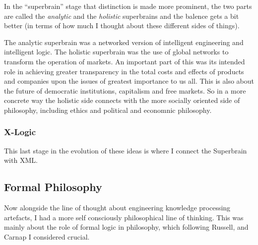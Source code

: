\documentclass{rbjk}
\begin{document}
\begin{article}
In the ``superbrain'' stage that distinction is made more prominent, the two parts are called the {\it analytic} and the {\it holistic} superbrains and the balence gets a bit better (in terms of how much I thought about these different sides of things).

The analytic superbrain was a networked version of intelligent engineering and intelligent logic.
The holistic superbrain was the use of global networks to transform the operation of markets.
An important part of this was its intended role in achieving greater transparency in the total costs and effects of products and companies upon the issues of greatest importance to us all.
This is also about the future of democratic institutions, capitalism and free markets.
So in a more concrete way the holistic side connects with the more socially oriented side of philosophy, including ethics and political and economnic philosophy.

\subsubsection{X-Logic}

This last stage in the evolution of these ideas is where I connect the Superbrain with XML.

\subsection{Formal Philosophy}

Now alongside the line of thought about engineering knowledge processing artefacts, I had a more self consciously philosophical line of thinking.
This was mainly about the role of formal logic in philosophy, which following Russell, and Carnap I considered crucial.

%
%

\end{article}
\end{document}
